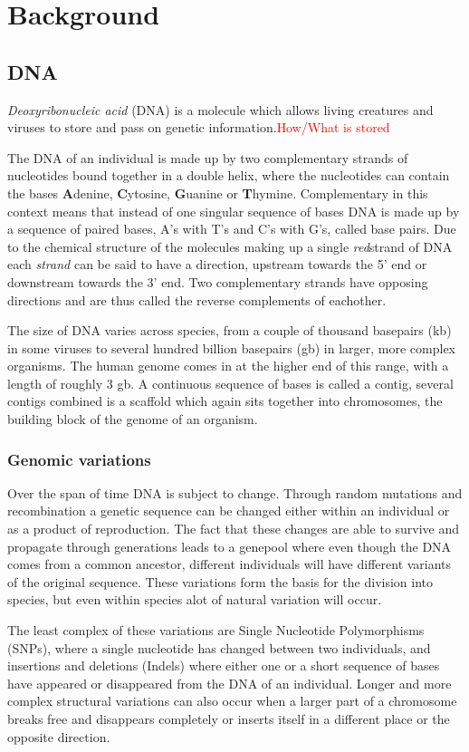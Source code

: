 \documentclass[thesis.tex]{subfiles}
\begin{document}
\chapter{Background}
\section{DNA}
\textit{Deoxyribonucleic acid} (DNA) is a molecule which allows living creatures and viruses to store and pass on genetic information.\textcolor{red}{How/What is stored}\\
\par\noindent
The DNA of an individual is made up by two complementary strands of nucleotides bound together in a double helix, where the nucleotides can contain the bases \textbf{A}denine, \textbf{C}ytosine, \textbf{G}uanine or \textbf{T}hymine. Complementary in this context means that instead of one singular sequence of bases DNA is made up by a sequence of paired bases, A's with T's and C's with G's, called base pairs. Due to the chemical structure of the molecules making up a single \textit{red}{strand} of DNA each \textit{strand} can be said to have a direction, upstream towards the 5' end or downstream towards the 3' end. Two complementary strands have opposing directions and are thus called the reverse complements of eachother.\\
\par\noindent
The size of DNA varies across species, from a couple of thousand basepairs (kb) in some viruses to several hundred billion basepairs (gb) in larger, more complex organisms. The human genome comes in at the higher end of this range, with a length of roughly 3 gb. A continuous sequence of bases is called a contig, several contigs combined is a scaffold which again sits together into chromosomes, the building block of the genome of an organism.\\
\subsection{Genomic variations}
Over the span of time DNA is subject to change. Through random mutations and recombination a genetic sequence can be changed either within an individual or as a product of reproduction. The fact that these changes are able to survive and propagate through generations leads to a genepool where even though the DNA comes from a common ancestor, different individuals will have different variants of the original sequence. These variations form the basis for the division into species, but even within species alot of natural variation will occur.\\
\par\noindent
The least complex of these variations are Single Nucleotide Polymorphisms (SNPs), where a single nucleotide has changed between two individuals, and insertions and deletions (Indels) where either one or a short sequence of bases have appeared or disappeared from the DNA of an individual. Longer and more complex structural variations can also occur when a larger part of a chromosome breaks free and disappears completely or inserts itself in a different place or the opposite direction. 
\end{document}
